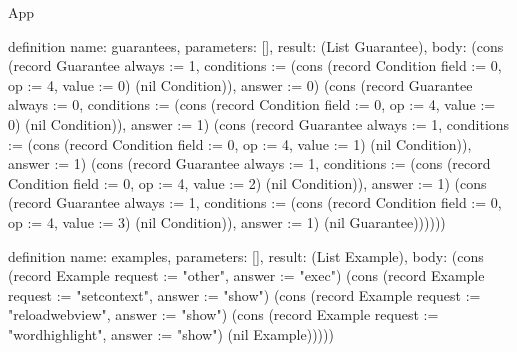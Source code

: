 \begin{lexlean}{App}
\begin{semanticmodule}
definition{
  name: guarantees,
  parameters: [],
  result: (List Guarantee),
  body: (cons (record Guarantee {always := 1, conditions := (cons (record Condition {field := 0, op := 4, value := 0}) (nil Condition)), answer := 0}) (cons (record Guarantee {always := 0, conditions := (cons (record Condition {field := 0, op := 4, value := 0}) (nil Condition)), answer := 1}) (cons (record Guarantee {always := 1, conditions := (cons (record Condition {field := 0, op := 4, value := 1}) (nil Condition)), answer := 1}) (cons (record Guarantee {always := 1, conditions := (cons (record Condition {field := 0, op := 4, value := 2}) (nil Condition)), answer := 1}) (cons (record Guarantee {always := 1, conditions := (cons (record Condition {field := 0, op := 4, value := 3}) (nil Condition)), answer := 1}) (nil Guarantee))))))
}

definition{
  name: examples,
  parameters: [],
  result: (List Example),
  body: (cons (record Example {request := "other", answer := "exec"}) (cons (record Example {request := "setcontext", answer := "show"}) (cons (record Example {request := "reloadwebview", answer := "show"}) (cons (record Example {request := "wordhighlight", answer := "show"}) (nil Example)))))
}
\end{semanticmodule}
\end{lexlean}

